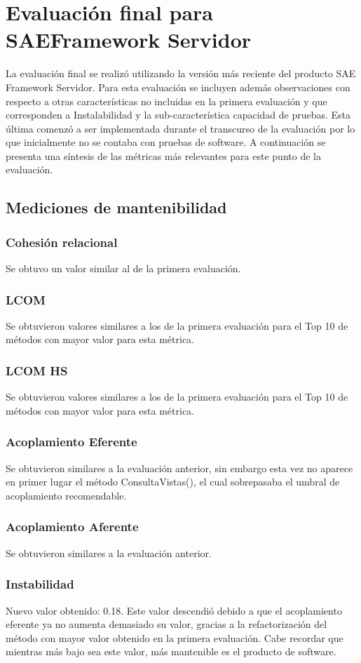 \section{Evaluación final para SAEFramework Servidor}
La evaluación final se realizó utilizando la versión más reciente del producto 
SAE Framework Servidor. Para esta evaluación se incluyen además observaciones 
con respecto a otras características no incluidas en la primera evaluación y 
que corresponden a Instalabilidad y la sub-característica capacidad de pruebas. 
Esta última comenzó a ser implementada durante el transcurso de la evaluación
por lo que inicialmente no se contaba con pruebas de software.
A continuación se presenta una síntesis de las métricas más relevantes para 
este punto de la evaluación.

\subsection{Mediciones de mantenibilidad}

\subsubsection{Cohesión relacional}
Se obtuvo un valor similar al de la primera evaluación.
\subsubsection{LCOM}
Se obtuvieron valores similares a los de la primera evaluación para el Top 10 de métodos
con mayor valor para esta métrica.
\subsubsection{LCOM HS}
Se obtuvieron valores similares a los de la primera evaluación para el Top 10 de métodos
con mayor valor para esta métrica.
\subsubsection{Acoplamiento Eferente}
Se obtuvieron similares a la evaluación anterior, sin embargo esta vez no aparece en primer lugar
el método ConsultaVistas(), el cual sobrepasaba el umbral de acoplamiento recomendable.
\subsubsection{Acoplamiento Aferente}
Se obtuvieron similares a la evaluación anterior.
\subsubsection{Instabilidad}
Nuevo valor obtenido: 0.18.
Este valor descendió debido a que el acoplamiento eferente ya no aumenta 
demasiado su valor, gracias a la refactorización del método con mayor valor obtenido en la primera evaluación.
Cabe recordar que mientras más bajo sea este valor, más mantenible es el producto de software.
